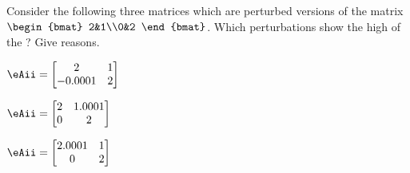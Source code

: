 \begin{exercise}  
Consider the following three matrices which are perturbed versions of the matrix
\(\begin{bmat} 2&1\\0&2 \end{bmat}\).
Which perturbations show the high  of the ?  
Give reasons.
\begin{Parts}
\item \(\eAii=\begin{bmatrix} 2&1\\-0.0001&2 \end{bmatrix}\)

\item \(\eAii=\begin{bmatrix} 2&1.0001\\0&2 \end{bmatrix}\)

\item \(\eAii=\begin{bmatrix} 2.0001&1\\0&2 \end{bmatrix}\)

\end{Parts}
\end{exercise}






